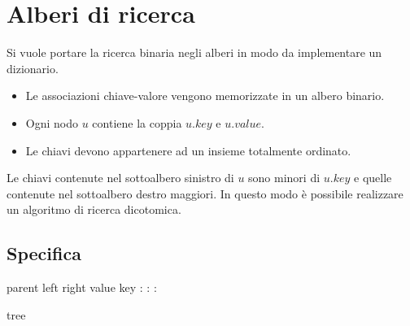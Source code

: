 \chapter{Alberi di ricerca}
Si vuole portare la ricerca binaria negli alberi in modo da implementare un dizionario.
\begin{itemize}
\item Le associazioni chiave-valore vengono memorizzate in un albero binario.
\item Ogni nodo $u$ contiene la coppia $u.key$ e $u.value$.
\item Le chiavi devono appartenere ad un insieme totalmente ordinato.
\end{itemize}
Le chiavi contenute nel sottoalbero sinistro di $u$ sono minori di $u.key$ e quelle contenute nel sottoalbero destro maggiori. In questo modo \`e possibile
realizzare un algoritmo di ricerca dicotomica.
\section{Specifica}
\begin{algorithm}[H]
\DontPrintSemicolon
{}

\caption{\protect\SearchBinary}

\begin{multicols}{2}
\Tree parent\;
\Tree left\;
\Tree right\;
\Item value\;
\Item key\;
\Item \Key{}\;
\Item \Value{}\;
\Tree \Parent{}\;
\Tree \Right{}\;
\Tree \Left{}\;
\Item {}\;
\;
\;
\Tree {}\;
\Tree {}\;
\Tree \Min{}\;
\Tree \Max{}\;
\Private : \Tree {}\;
\Private : \Tree {}\;
\Private : \Tree {}
\end{multicols}
\end{algorithm}
\begin{algorithm}
\DontPrintSemicolon
{}

\caption{\protect\Dictionary}

\Tree tree\;
\end{algorithm}
\newpage
